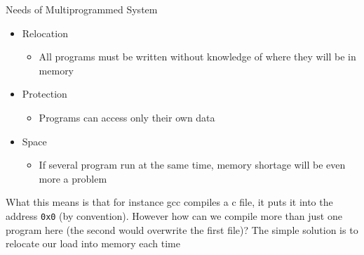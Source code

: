 \begin{parag}{Needs of Multiprogrammed System}
    \begin{itemize}
		\item Relocation 
			\begin{itemize}
				\item All programs must be written without knowledge of where they will be in memory
			\end{itemize}
		\item Protection 
			\begin{itemize}
				\item Programs can access only their own data
			\end{itemize}
		\item Space
			\begin{itemize}
				\item If several program run at the same time, memory shortage will be even more a problem
			\end{itemize}
    \end{itemize}
	What this means is that for instance gcc compiles a c file, it puts it into the address \texttt{0x0} (by convention). However how can we compile more than just one program here (the second would overwrite the first file)? The simple solution is to relocate our load into memory each time
\end{parag}
